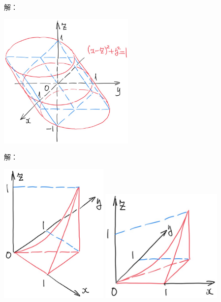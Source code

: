 \begin{frame}
	\linespread{1.5}
	
	\small 解：
	\begin{center}
		\includegraphics[width=0.5\textwidth]{./images/ch8/xzy-cl.jpg}
	\end{center}
\end{frame}


\begin{frame}
	\linespread{1.5}
	
	\small 解：	
	\begin{center}
		\includegraphics[width=0.4\textwidth]{./images/ch8/3int-1.jpg}\quad\quad
		\includegraphics[width=0.45\textwidth]{./images/ch8/3int-2.jpg}
	\end{center}
	\fin
\end{frame}

